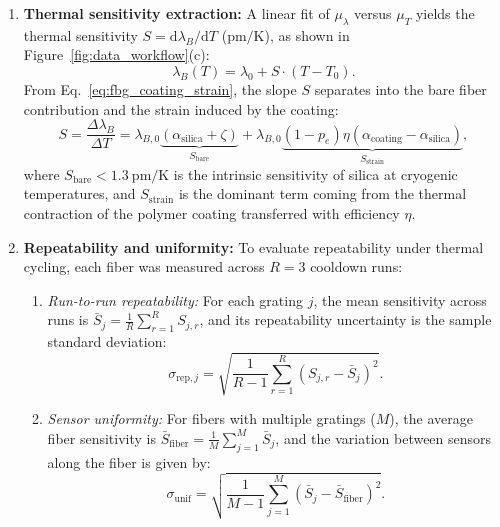 \documentclass[12pt]{article}
\begin{document}
\begin{enumerate}
    \item \textbf{Thermal sensitivity extraction:}
    A linear fit of $\mu_\lambda$ versus $\mu_T$ yields the thermal sensitivity $S = \mathrm{d}\lambda_B/\mathrm{d}T$ ($\text{pm/K}$), as shown in Figure~\ref{fig:data_workflow}(c):
    \begin{equation}
        \lambda_B(T) = \lambda_0 + S \cdot (T - T_0).
        \label{eq:linear_sensitivity}
    \end{equation}
    From Eq.~\ref{eq:fbg_coating_strain}, the slope $S$ separates into the bare fiber contribution and the strain induced by the coating:
    \begin{equation}
        S = \frac{\Delta \lambda_B}{\Delta T} = \lambda_{B,0} \underbrace{(\alpha_{\text{silica}} + \zeta)}_{S_{\text{bare}}} + \lambda_{B,0} \underbrace{(1 - p_e) \eta (\alpha_{\text{coating}} - \alpha_{\text{silica}})}_{S_{\text{strain}}},
        \label{eq:sensitivity_physics}
    \end{equation}
    where $S_{\text{bare}} < 1.3~\text{pm/K}$ is the intrinsic sensitivity of silica at cryogenic temperatures, and $S_{\text{strain}}$ is the dominant term coming from the thermal contraction of the polymer coating transferred with efficiency $\eta$.

    \item \textbf{Repeatability and uniformity:}
    To evaluate repeatability under thermal cycling, each fiber was measured across $R = 3$ cooldown runs:
    \begin{enumerate}
        \item \textit{Run-to-run repeatability:} For each grating $j$, the mean sensitivity across runs is $\bar{S}_j = \frac{1}{R}\sum_{r=1}^R S_{j,r}$, and its repeatability uncertainty is the sample standard deviation:
        \begin{equation}
            \sigma_{\text{rep}, j} = \sqrt{\frac{1}{R - 1} \sum_{r=1}^{R} (S_{j,r} - \bar{S}_j)^2}.
            \label{eq:repeatability_error}
        \end{equation}
        \item \textit{Sensor uniformity:} For fibers with multiple gratings ($M$), the average fiber sensitivity is $\bar{S}_{\text{fiber}} = \frac{1}{M}\sum_{j=1}^M \bar{S}_j$, and the variation between sensors along the fiber is given by:
        \begin{equation}
            \sigma_{\text{unif}} = \sqrt{\frac{1}{M - 1} \sum_{j=1}^{M} (\bar{S}_j - \bar{S}_{\text{fiber}})^2}.
        \end{equation}
    \end{enumerate}
\end{enumerate}
\end{document}
